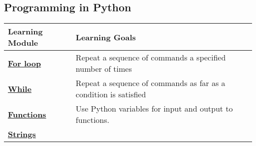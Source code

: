 \documentclass[11pt]{article}
\begin{document}
\subsection{Programming in Python}\label{programming-in-python}

\begin{longtable}[]{@{}ll@{}}
\toprule
\begin{minipage}[b]{0.29\columnwidth}\raggedright\strut
\textbf{Learning Module}\strut
\end{minipage} & \begin{minipage}[b]{0.29\columnwidth}\raggedright\strut
\textbf{Learning Goals}\strut
\end{minipage}\tabularnewline
\midrule
\endhead
\begin{minipage}[t]{0.29\columnwidth}\raggedright\strut
\textbf{\href{http://interactivepython.org/runestone/static/thinkcspy/PythonTurtle/TheforLoop.html}{For
loop}}\strut
\end{minipage} & \begin{minipage}[t]{0.29\columnwidth}\raggedright\strut
Repeat a sequence of commands a specified number of times\strut
\end{minipage}\tabularnewline
\begin{minipage}[t]{0.29\columnwidth}\raggedright\strut
\textbf{\href{http://interactivepython.org/runestone/static/thinkcspy/MoreAboutIteration/ThewhileStatement.html}{While}}\strut
\end{minipage} & \begin{minipage}[t]{0.29\columnwidth}\raggedright\strut
Repeat a sequence of commands as far as a condition is satisfied\strut
\end{minipage}\tabularnewline
\begin{minipage}[t]{0.29\columnwidth}\raggedright\strut
\textbf{\href{http://interactivepython.org/runestone/static/thinkcspy/Functions/toctree.html}{Functions}}\strut
\end{minipage} & \begin{minipage}[t]{0.29\columnwidth}\raggedright\strut
Use Python variables for input and output to functions.\strut
\end{minipage}\tabularnewline
\begin{minipage}[t]{0.29\columnwidth}\raggedright\strut
\textbf{\href{http://interactivepython.org/runestone/static/thinkcspy/Strings/toctree.html}{Strings}}\strut
\end{minipage} & \begin{minipage}[t]{0.29\columnwidth}\raggedright\strut

\end{minipage}
\end{longtable}
\end{document}

